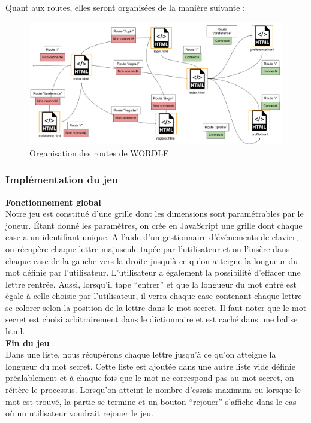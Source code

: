 Quant aux routes, elles seront organisées de la manière suivante :

\begin{figure}[h!]
\centering
\includegraphics[width=12cm]{figures/schema_routes.png}
\caption{Organisation des routes de WORDLE}
\end{figure}

\subsubsection{Implémentation du jeu}
\textbf{Fonctionnement global} \\

\tabto{1cm}Notre jeu est constitué d’une grille dont les dimensions sont paramétrables par le joueur. Étant donné les paramètres, on crée en JavaScript une grille dont chaque case a un identifiant unique. A l’aide d’un gestionnaire d'événements de clavier, on récupère chaque lettre majuscule tapée par l’utilisateur et on l’insère dans chaque case de la gauche vers la droite jusqu’à ce qu’on atteigne la longueur du mot définie par l’utilisateur. L’utilisateur a également la possibilité d’effacer une lettre rentrée. Aussi, lorsqu’il tape “entrer” et que la longueur du mot entré est égale à celle choisie par l’utilisateur, il verra chaque case contenant chaque lettre se colorer selon la position de la lettre dans le mot secret. Il faut noter que le mot secret est choisi arbitrairement dans le dictionnaire et est caché dans une balise html.\\

\tabto{0cm}\textbf{Fin du jeu}\\

\tabto{1cm}Dans une liste, nous récupérons chaque lettre jusqu’à ce qu’on atteigne la longueur du mot secret. Cette liste est ajoutée dans une autre liste vide définie préalablement et à chaque fois que le mot ne correspond pas au mot secret, on réitère le processus.
Lorsqu’on atteint le nombre d’essais maximum ou lorsque le mot est trouvé, la partie se termine et un bouton “rejouer” s’affiche dans le cas où un utilisateur voudrait rejouer le jeu. 


